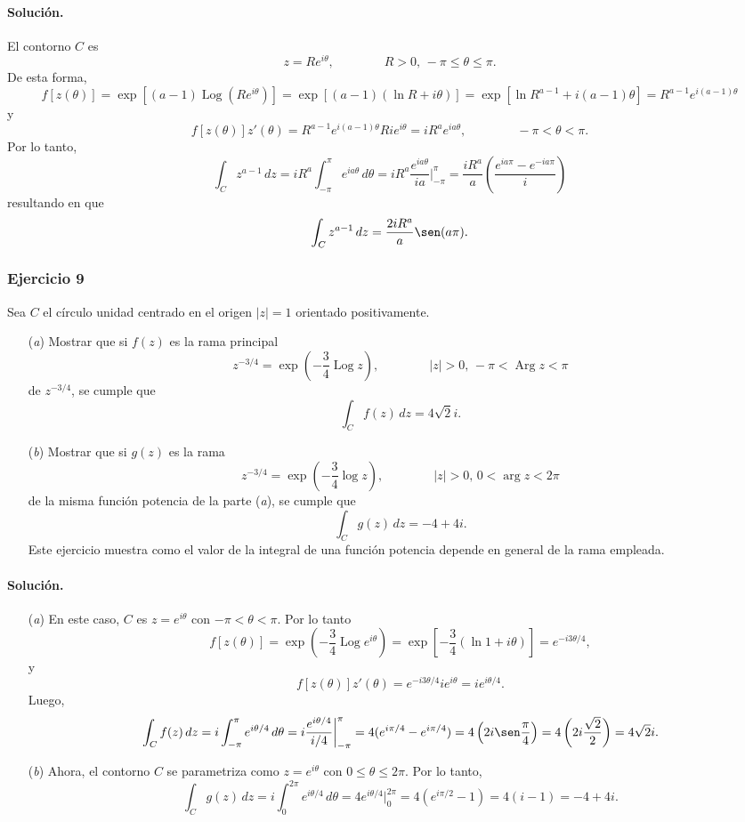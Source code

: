 \documentclass[a4paper]{report}
\DeclareMathOperator{\Arg}{Arg}
\DeclareMathOperator{\Log}{Log}
\begin{document}
\paragraph{Solución.} El contorno \(C\) es
\[
 z=Re^{i\theta},
 \qquad\qquad
 R>0,\,-\pi\leq\theta\leq\pi.
\]
De esta forma,
\[
 f[z(\theta)]=\exp\left[(a-1)\Log(Re^{i\theta})\right]=\exp\left[(a-1)(\ln R+i\theta)\right]
  =\exp\left[\ln R^{a-1}+i(a-1)\theta\right]=R^{a-1}e^{i(a-1)\theta}
\]
y
\begin{equation}\label{eq:exercise_46_08_integrand}
  f[z(\theta)]z'(\theta)=R^{a-1}e^{i(a-1)\theta}Rie^{i\theta}=iR^ae^{ia\theta},
 \qquad\qquad
 -\pi<\theta<\pi.
\end{equation}
Por lo tanto,
\[
 \int_C z^{a-1}\,dz=iR^a\int_{-\pi}^{\pi}e^{ia\theta}\,d\theta=iR^a\frac{e^{ia\theta}}{ia}\bigg|_{-\pi}^{\pi}
  =\frac{iR^a}{a}\left(\frac{e^{ia\pi}-e^{-ia\pi}}{i}\right)
\]
resultando en que 
\[
 \int_C z^{a-1}\,dz=\frac{2iR^a}{a}\sen(a\pi).
\]

\subsubsection{Ejercicio 9}

Sea \(C\) el círculo unidad centrado en el origen \(|z|=1\) orientado positivamente.
\begin{enumerate}
 \item[(\textit{a})] Mostrar que si \(f(z)\) es la rama principal
 \[
  z^{-3/4}=\exp\left(-\frac{3}{4}\Log z\right),
 \qquad\qquad
 |z|>0,\,-\pi<\Arg z<\pi
 \]
 de \(z^{-3/4}\), se cumple que 
 \[
  \int_Cf(z)\,dz=4\sqrt{2}i.
 \]
 \item[(\textit{b})] Mostrar que si \(g(z)\) es la rama
 \[
  z^{-3/4}=\exp\left(-\frac{3}{4}\log z\right),
 \qquad\qquad
 |z|>0,\,0<\arg z<2\pi
 \]
 de la misma función potencia de la parte (\textit{a}), se cumple que 
 \[
  \int_Cg(z)\,dz=-4+4i.
 \]
 Este ejercicio muestra como el valor de la integral de una función potencia depende en general de la rama empleada.
\end{enumerate}

\paragraph{Solución.}
\begin{enumerate}
 \item[(\textit{a})] En este caso, \(C\) es \(z=e^{i\theta}\) con \(-\pi<\theta<\pi\). Por lo tanto
 \[
  f[z(\theta)]=\exp\left(-\frac{3}{4}\Log e^{i\theta}\right)=\exp\left[-\frac{3}{4}(\ln1+i\theta)\right]=e^{-i3\theta/4},
 \]
 y
 \[
  f[z(\theta)]z'(\theta)=e^{-i3\theta/4}ie^{i\theta}=ie^{i\theta/4}.
 \]
 Luego,
 \[
  \int_Cf(z)\,dz=i\int_{-\pi}^\pi e^{i\theta/4}\,d\theta=i\frac{e^{i\theta/4}}{i/4}\bigg|_{-\pi}^\pi=4(e^{i\pi/4}-e^{i\pi/4})=4\left(2i\sen\frac{\pi}{4}\right)=4\left(2i\frac{\sqrt{2}}{2}\right)=4\sqrt{2}i.
 \]
 \item[(\textit{b})] Ahora, el contorno \(C\) se parametriza como \(z=e^{i\theta}\) con \(0\leq\theta\leq2\pi\). Por lo tanto, 
 \[
  \int_Cg(z)\,dz=i\int_0^{2\pi}e^{i\theta/4}\,d\theta=4e^{i\theta/4}\bigg|_0^{2\pi}=4(e^{i\pi/2}-1)=4(i-1)=-4+4i.
 \]
\end{enumerate}
\end{document}
